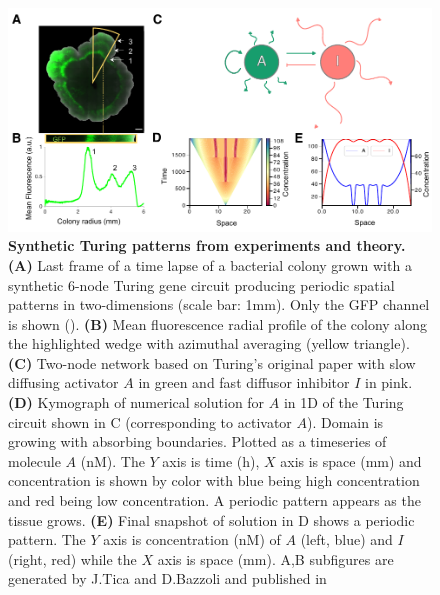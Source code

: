 \begin{figure}[H]
    \includegraphics[width=1\textwidth]{figures/biological_example}

    \caption{{\bf Synthetic Turing patterns from experiments and theory.}
        \textbf{(A)} Last frame of a time lapse of a bacterial colony grown with a synthetic 6-node Turing gene circuit producing periodic spatial patterns in two-dimensions (scale bar: 1mm). Only the GFP channel is shown (\cite{Oliver2023}). \textbf{(B)} Mean fluorescence radial profile of the colony along the highlighted wedge with azimuthal averaging (yellow triangle). \textbf{(C)} Two-node network based on Turing’s original paper \cite{Turing1952} with slow diffusing activator $A$ in green and fast diffusor inhibitor $I$ in pink. \textbf{(D)} Kymograph of numerical solution for $A$ in 1D of the Turing circuit shown in C (corresponding to activator $A$). Domain is growing with absorbing boundaries. Plotted as a timeseries of molecule $A$ (nM). The $Y$ axis is time (h), $X$ axis is space (mm) and concentration is shown by color with blue being high concentration and red being low concentration. A periodic pattern appears as the tissue grows. \textbf{(E)} Final snapshot of solution in D shows a periodic pattern. The $Y$ axis is concentration (nM) of $A$ (left, blue) and $I$ (right, red) while the $X$ axis is space (mm). A,B subfigures are generated by J.Tica and D.Bazzoli and published in \cite{Oliver2023}}
    \label{fig1}
\end{figure}


